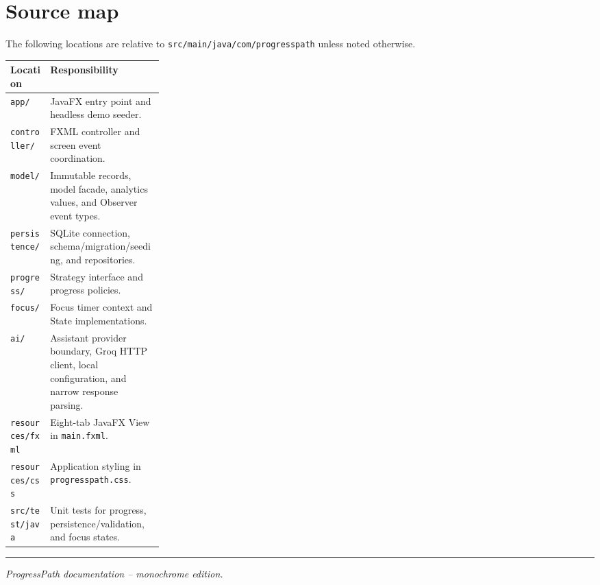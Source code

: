 \documentclass[11pt,a4paper]{article}
\newcommand{\code}[1]{\texttt{#1}}
\begin{document}
\section{Source map}

The following locations are relative to \code{src/main/java/com/progresspath} unless noted otherwise.

\begin{tabularx}{\linewidth}{@{}L{0.26\linewidth}Y@{}}
\toprule
\textbf{Location} & \textbf{Responsibility}\\
\midrule
\code{app/} & JavaFX entry point and headless demo seeder.\\
\code{controller/} & FXML controller and screen event coordination.\\
\code{model/} & Immutable records, model facade, analytics values, and Observer event types.\\
\code{persistence/} & SQLite connection, schema/migration/seeding, and repositories.\\
\code{progress/} & Strategy interface and progress policies.\\
\code{focus/} & Focus timer context and State implementations.\\
\code{ai/} & Assistant provider boundary, Groq HTTP client, local configuration, and narrow response parsing.\\
\code{resources/fxml} & Eight-tab JavaFX View in \code{main.fxml}.\\
\code{resources/css} & Application styling in \code{progresspath.css}.\\
\code{src/test/java} & Unit tests for progress, persistence/validation, and focus states.\\
\bottomrule
\end{tabularx}

\vfill
\noindent\rule{\linewidth}{0.6pt}\par
{\small\textit{ProgressPath documentation -- monochrome edition.}\par}
\end{document}

